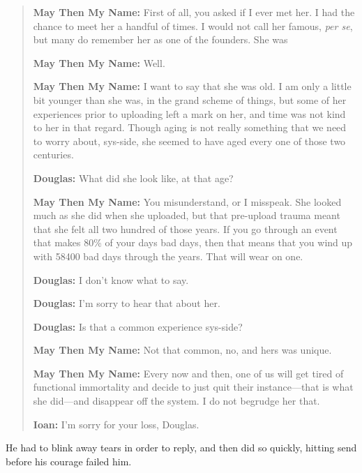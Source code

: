 \begin{quote}
\textbf{May Then My Name:} First of all, you asked if I ever met her. I had the chance to meet her a handful of times. I would not call her famous, \emph{per se}, but many do remember her as one of the founders. She was

\textbf{May Then My Name:} Well.

\textbf{May Then My Name:} I want to say that she was old. I am only a little bit younger than she was, in the grand scheme of things, but some of her experiences prior to uploading left a mark on her, and time was not kind to her in that regard. Though aging is not really something that we need to worry about, sys-side, she seemed to have aged every one of those two centuries.

\textbf{Douglas:} What did she look like, at that age?

\textbf{May Then My Name:} You misunderstand, or I misspeak. She looked much as she did when she uploaded, but that pre-upload trauma meant that she felt all two hundred of those years. If you go through an event that makes 80\% of your days bad days, then that means that you wind up with 58400 bad days through the years. That will wear on one.

\textbf{Douglas:} I don't know what to say.

\textbf{Douglas:} I'm sorry to hear that about her.

\textbf{Douglas:} Is that a common experience sys-side?

\textbf{May Then My Name:} Not that common, no, and hers was unique.

\textbf{May Then My Name:} Every now and then, one of us will get tired of functional immortality and decide to just quit their instance---that is what she did---and disappear off the system. I do not begrudge her that.

\textbf{Ioan:} I'm sorry for your loss, Douglas.
\end{quote}

\noindent He had to blink away tears in order to reply, and then did so quickly, hitting send before his courage failed him.

